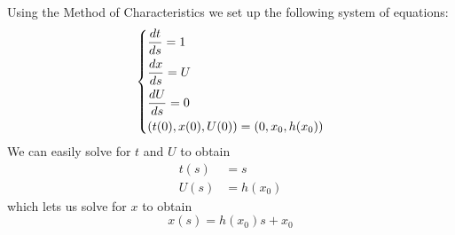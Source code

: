 \documentclass{article}
\begin{document}
Using the Method of Characteristics we set up the following system of
equations:
%
\begin{equation*}
    \begin{dcases}
        \frac{d t}{d s} = 1 \\
        \frac{d x}{d s} = U \\
        \frac{d U}{d s} = 0 \\
        \left( t(0), x(0), U(0)\right) = \left( 0, x_ 0, h(x_0) \right)
    \end{dcases}
\end{equation*}
%
We can easily solve for $t$ and $U$ to obtain
%
\begin{align*}
    t(s) &= s \\
    U(s) &= h(x_0)
\end{align*}
%
which lets us solve for $x$ to obtain
%
\begin{equation*}
    x(s) = h(x_0) s + x_0
\end{equation*}
\end{document}
